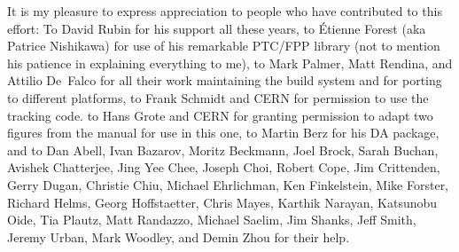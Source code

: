 It is my pleasure to express appreciation to people who have contributed to this effort:
To David Rubin for his support all these years, to \'Etienne Forest (aka Patrice
Nishikawa) for use of his remarkable PTC/FPP library (not to mention his patience in
explaining everything to me), to Mark Palmer, Matt Rendina, and Attilio De~Falco for all
their work maintaining the build system and for porting \bmad to different platforms, to
Frank Schmidt and CERN for permission to use the \mad tracking code. to Hans Grote and
CERN for granting permission to adapt two figures from the \mad manual for use in this
one, to Martin Berz for his DA package, and to Dan Abell, Ivan Bazarov, Moritz Beckmann,
Joel Brock, Sarah Buchan, Avishek Chatterjee, Jing Yee Chee, Joseph Choi, Robert Cope, Jim
Crittenden, Gerry Dugan, Christie Chiu, Michael Ehrlichman, Ken Finkelstein, Mike Forster,
Richard Helms, Georg Hoffstaetter, Chris Mayes, Karthik Narayan, Katsunobu Oide, Tia
Plautz, Matt Randazzo, Michael Saelim, Jim Shanks, Jeff Smith, Jeremy Urban, Mark Woodley,
and Demin Zhou for their help.

